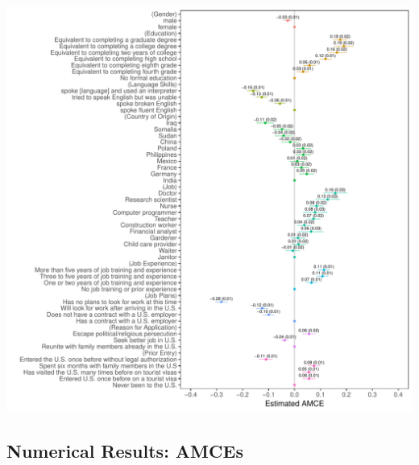 \documentclass[a4paper,12pt]{article}\usepackage[]{graphicx}\usepackage[]{color}
\makeatletter
\def\maxwidth{ %
  \ifdim\Gin@nat@width>\linewidth
    \linewidth
  \else
    \Gin@nat@width
  \fi
}
\newenvironment{knitrout}{}{} %
\makeatother
\begin{document}
\begin{knitrout}
\color{fgcolor}
\includegraphics[width=\maxwidth]{figure/hainmueller_immigration_amce_appendix-1} 

\end{knitrout}

\clearpage

\subsection{Numerical Results: AMCEs}
\end{document}
